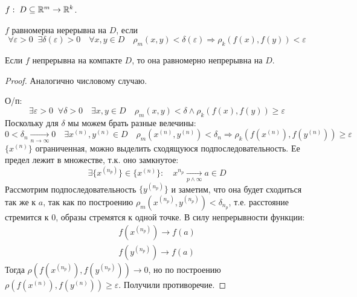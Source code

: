 \begin{definition}
    $f:\; D \subseteq \mathbb{R}^m \rightarrow \mathbb{R}^k$. 

    $f$ равномерна нерерывна на $D$, если
    \[
        \forall \varepsilon > 0\;\; \exists \delta(\varepsilon) > 0 \quad
        \forall x, y \in D \quad \rho_m(x, y) < \delta(\varepsilon) \Rightarrow \rho_k(f(x), f(y)) < \varepsilon
    \]
\end{definition}

\begin{theorem}
    Если $f$ непрерывна на компакте $D$, то она равномерно непрерывна на $D$.
\end{theorem}

\begin{proof}
    Аналогично числовому случаю.

    О/п:
    \[
        \exists \varepsilon > 0\;\; \forall \delta > 0 \quad
        \exists x, y \in D \quad \rho_m(x, y) < \delta \wedge \rho_k(f(x), f(y)) \geqslant \varepsilon
    \]
    Поскольку для $\delta$ мы можем брать разные велечины:
    \[
        0 < \delta_n  \xrightarrow[n \rightarrow \infty]{} 0 \quad
        \exists x^{(n)}, y^{(n)} \in D \quad \rho_m(x^{(n)}, y^{(n)}) < \delta_n \Rightarrow \rho_k(f(x^{(n)}), f(y^{(n)})) \geqslant \varepsilon
    \]
    $\{x^{(n)}\}$ ограниченная, можно выделить сходящуюся подпоследовательность. Ее предел лежит в множестве, т.к. оно замкнутое:
    \[
        \exists \{x^{(n_p)}\} \in \{x^{(n)}\}: \quad x^{n_p} \xrightarrow[p \wedge \infty]{} a \in D
    \]
    Рассмотрим подпоследовательность $\{y^{(n_p)}\}$ 
    и заметим, что она будет сходиться так же к $a$, так как по построению
    $\rho_m(x^{(n_p)}, y^{(n_p)}) < \delta_{n_p}$, т.е. расстояние стремится к 0, образы стремятся к одной точке.
    В силу непрерывности функции:
    \begin{gather*}
        f(x^{(n_p)}) \rightarrow f(a)\\
        f(y^{(n_p)}) \rightarrow f(a)
    \end{gather*}    
    Тогда $\rho(f(x^{(n_p)}), f(y^{(n_p)})) \rightarrow 0$, но по построению $\rho(f(x^{(n)}), f(y^{(n)})) \geqslant \varepsilon$. Получили противоречие.
\end{proof}

